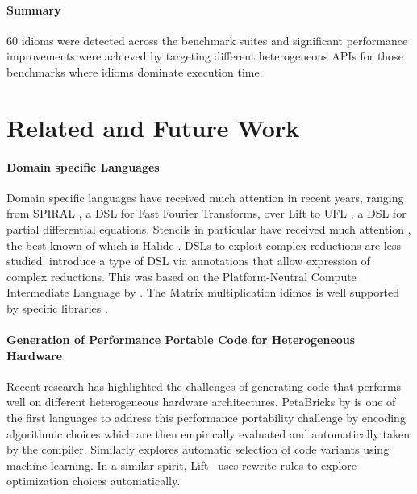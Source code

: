 {\paragraph*{Summary}

    60 idioms were detected across the benchmark suites and significant
    performance improvements were achieved by targeting different heterogeneous
    APIs for those benchmarks where idioms dominate execution time.

\section{Related and Future Work}

\paragraph*{Domain specific Languages}
    Domain specific languages have received much attention in recent years,
    ranging from SPIRAL \citep{ofenbeck13spiral}, a DSL for Fast Fourier
    Transforms, over Lift \citep{steuwer15rewrite, SteuwerRD17,HagedornSSGD18}
    to UFL \citep{Alnaes:2014:UFL:2594412.2566630}, a DSL for partial
    differential equations.
    Stencils in particular have received much attention
    \citep{Mullapudi:2015:PAO:2694344.2694364,HagedornSSGD18}, the best known of
    which is Halide \citep{Ragan-Kelley2013Halide}.
    DSLs to exploit complex reductions are less studied.
    \citet{Reddy2016Reduction} introduce a type of DSL via annotations
    that allow expression of complex reductions.
    This was based on the  Platform-Neutral Compute Intermediate Language by
    \citet{baghdadi2015PENCIL}.
    The Matrix multiplication idimos is well supported by
    specific libraries \citep{clblas,mkl,cublas}.

\paragraph*{Generation of Performance Portable Code for Heterogeneous Hardware}
    Recent research has highlighted the challenges of generating code that
    performs well on different heterogeneous hardware architectures.
    PetaBricks by \citet{PhothilimthanaARA13} is one of the first languages to
    address this performance portability challenge by encoding algorithmic
    choices which are then empirically evaluated and automatically taken by the
    compiler.
    Similarly \cite{MuralidharanRHG16} explores automatic selection of code
    variants using machine learning.
    In a similar spirit, Lift~\cite{steuwer15rewrite} uses rewrite rules to
    explore optimization choices automatically.

}

